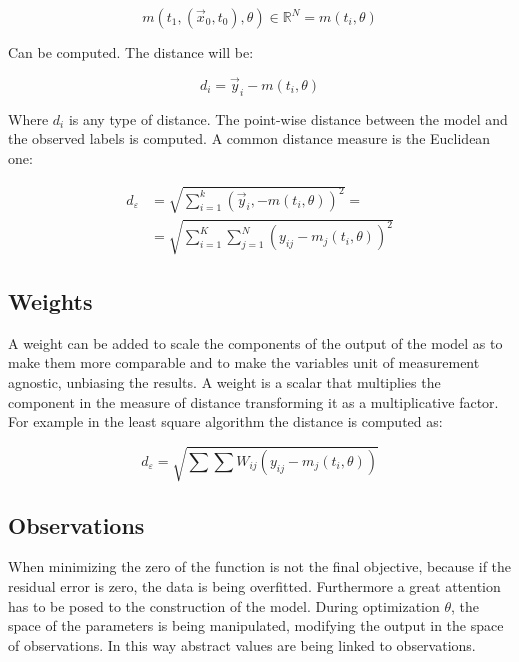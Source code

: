   $$m\left(t_1,\left(\vec{x}_0, t_0\right), \theta\right) \in \mathbb{R}^{N} = m(t_i,\theta)$$

  Can be computed.
  The distance will be:

  $$d_i=\vec{y}_i-m(t_i, \theta)$$

  Where $d_i$ is any type of distance.
  The point-wise distance between the model and the observed labels is computed.
  A common distance measure is the Euclidean one:

  \begin{align*}
    d_\varepsilon &=\sqrt{\sum_{i=1}^k(\vec{y}_i,-m(t_i, \theta))^2}=\\
                  &=\sqrt{\sum_{i=1}^{K} \sum_{j=1}^{N} \left(y_{ij}-m_j\left(t_i, \theta\right)\right)^2}
  \end{align*}

  \subsection{Weights}
  A weight can be added to scale the components of the output of the model as to make them more comparable and to make the variables unit of measurement agnostic, unbiasing the results.
  A weight is a scalar that multiplies the component in the measure of distance transforming it as a multiplicative factor.
  For example in the least square algorithm the distance is computed as:

  $$d_\varepsilon=\sqrt{\sum \sum W_{ij}\left(y_{ij}-m_j\left(t_i, \theta\right)\right)}$$


  \subsection{Observations}
  When minimizing the zero of the function is not the final objective, because if the residual error is zero, the data is being overfitted.
  Furthermore a great attention has to be posed to the construction of the model.
  During optimization $\theta$, the space of the parameters is being manipulated, modifying the output in the space of observations.
  In this way abstract values are being linked to observations.
